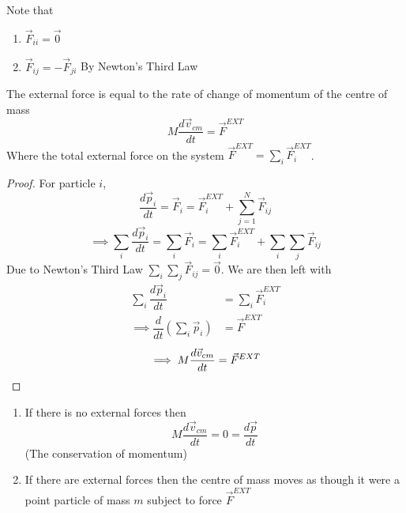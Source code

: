 \documentclass[10pt]{scrartcl}
\begin{document}
Note that
\begin{enumerate}
\item $\vec{F}_{ii} = \vec{0}$
\item $\vec{F}_{ij} = -\vec{F}_{ji}$ By Newton's Third Law
\end{enumerate}

\begin{theorem}
The external force is equal to the rate of change of momentum of the centre of mass
	\[M\frac{d\vec{v}_{cm}}{dt} = \vec{F}^{EXT}\]
	Where the total external force on the system $\vec{F}^{EXT} = \sum_i\vec{F}_i^{EXT}$.
\end{theorem}
\begin{proof}

For particle $i$, \[\dfrac{d\vec{p}_i}{dt} = \vec{F}_i = \vec{F}_i^{EXT} + \sum_{j=1}^N\vec{F}_{ij}\] 
\[\implies \sum_i \dfrac{d\vec{p}_i}{dt} = \sum_i\vec{F}_i = \sum_i\vec{F}_i^{EXT} + \sum_i\sum_j\vec{F}_{ij} \]
Due to Newton's Third Law $\sum_i\sum_j\vec{F}_{ij} = \vec{0}$. We are then left with 
\[\begin{aligned}\sum_i\dfrac{d\vec{p}_i}{dt} &= \sum_i\vec{F}_i^{EXT}\\
\implies \dfrac{d}{dt}(\sum_i \vec{p}_i) &= \vec{F}^{EXT}\end{aligned}
\]
\[\implies M\frac{d\vec{v}_{cm}}{dt} = \vec{F}^{EXT}\qedhere\]
\end{proof}

\begin{enumerate}
\item If there is no external forces then 
\[M \frac{d\vec{v}_{cm}}{dt} = 0 = \frac{d\vec{p}}{dt}\]
(The conservation of momentum)
\item	If there are external forces then the centre of mass moves as though it were a point particle of mass $m$ subject to force $\vec{F}^{EXT}$
\end{enumerate}


\pagebreak

\begin{center}
\end{center}
\end{document}
